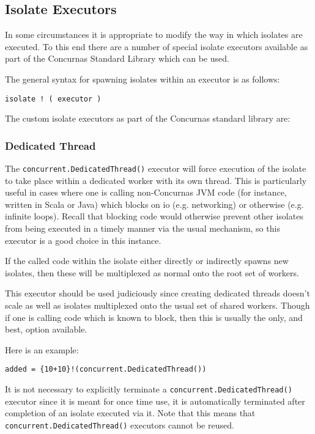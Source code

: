 \documentclass[conc-doc]{subfiles}
\begin{document}
\subsection{Isolate Executors}
In some circumstances it is appropriate to modify the way in which isolates are executed. To this end there are a number of special isolate executors available as part of the Concurnas Standard Library which can be used.

The general syntax for spawning isolates within an executor is as follows:

\begin{center}
	\lstinline{isolate ! ( executor )}
\end{center}

The custom isolate executors as part of the Concurnas standard library are:

\subsubsection{Dedicated Thread}
The \lstinline{concurrent.DedicatedThread()} executor will force execution of the isolate to take place within a dedicated worker with its own thread. This is particularly useful in cases where one is calling non-Concurnas JVM code (for instance, written in Scala or Java) which blocks on io (e.g. networking) or otherwise (e.g. infinite loops). Recall that blocking code would otherwise prevent other isolates from being executed in a timely manner via the usual mechanism, so this executor is a good choice in this instance.

If the called code within the isolate either directly or indirectly spawns new isolates, then these will be multiplexed as normal onto the root set of workers.

This executor should be used judiciously since creating dedicated threads doesn't scale as well as isolates multiplexed onto the usual set of shared workers. Though if one is calling code which is known to block, then this is usually the only, and best, option available.

Here is an example:

\begin{lstlisting}
added = {10+10}!(concurrent.DedicatedThread())
\end{lstlisting}

It is not necessary to explicitly terminate a \lstinline{concurrent.DedicatedThread()} executor since it is meant for once time use, it is automatically terminated after completion of an isolate executed via it. Note that this means that \lstinline{concurrent.DedicatedThread()} executors cannot be reused.
\end{document}
